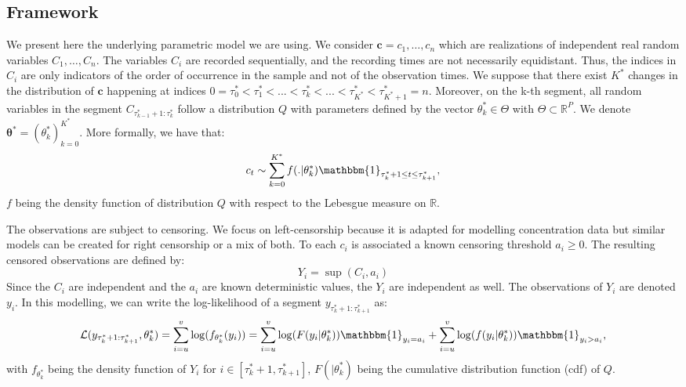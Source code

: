 \subsection{Framework}

We present here the underlying parametric model we are using. We consider $\bm c = c_1,\dots,c_n$ which are realizations of independent real random variables $C_1,\dots,C_n$. The variables $C_i$ are recorded sequentially, and the recording times are not necessarily equidistant. Thus, the indices in $C_i$ are only indicators of the order of occurrence in the sample and not of the observation times. We suppose that there exist $K^*$ changes in the distribution of $\bm c$ happening at indices $0=\tau_0^*<\tau^*_1 <... < \tau^*_k <... < \tau^*_{K^*}<\tau^*_{K^*+1}=n$. Moreover, on the k-th segment, all random variables in the segment $C_{\tau^*_{k-1}+1:\tau^*_{k}}$ follow a distribution $Q$ with parameters defined by the vector $\theta^*_k\in\Theta$ with $\Theta\subset\mathbb{R}^P$. We denote $\bm{\theta^*} = (\theta^*_k)_{k=0}^{K^*}$. More formally, we have that:  
$$c_t \sim \sum_{k=0}^{K^*} f(.\vert\theta^*_k)\mathbbm{1}_{\tau^*_{k}+1\leq t \leq \tau^*_{k+1}},$$
$f$ being the density function of distribution $Q$ with respect to the Lebesgue measure on $\mathbb{R}$.  


The observations are subject to censoring. We focus on left-censorship because it is adapted for modelling concentration data but similar models can be created for right censorship or a mix of both. To each $c_i$ is associated a known censoring threshold $a_i \ge 0$. The resulting censored observations are defined by:  
\begin{equation}\label{chp:4:defy}
Y_i = \sup(C_i,a_i)
\end{equation}
Since the $C_i$ are independent and the $a_i$ are known deterministic values, the $Y_i$ are independent as well. The observations of $Y_i$ are denoted $y_i$. In this modelling, we can write the log-likelihood of a segment $y_{\tau^*_k+1:\tau^*_{k+1}}$ as:  
\begin{equation}\label{chp:4:loglik}
\mathcal{L}(y_{\tau^*_k+1:\tau^*_{k+1}},\theta^*_k) = \sum_{i = u}^v\log(f_{\theta^*_k}(y_i)) = \sum_{i = u}^v\log(F(y_i\vert\theta^*_k))\mathbbm{1}_{y_i=a_i}+\sum_{i = u}^v\log(f(y_i \vert\theta^*_k))\mathbbm{1}_{y_i>a_i},
\end{equation}
with $f_{\theta^*_k}$ being the density function of $Y_i$ for $i \in [\tau^*_k+1,\tau^*_{k+1}]$, $F(\vert\theta^*_k)$ being the cumulative distribution function (cdf) of $Q$. 

